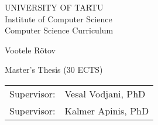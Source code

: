 \documentclass{style/master-thesis}
\begin{document}
\thispagestyle{empty}
\begin{center}

\large
UNIVERSITY OF TARTU\\[2mm]
Institute of Computer Science\\
Computer Science Curriculum\\[2mm]

\vspace{25mm}

\Large Vootele Rõtov

\vspace{4mm}

\huge \articleName

\vspace{20mm}

\Large Master's Thesis (30 ECTS)

\end{center}

\vspace{2mm}

\begin{flushright}
 {
 \setlength{\extrarowheight}{5pt}
 \begin{tabular}{r l} 
  \sffamily Supervisor: & \sffamily Vesal Vodjani, PhD \\
  \sffamily Supervisor: & \sffamily Kalmer Apinis, PhD
 \end{tabular}
 }
\end{flushright}

\vspace{10mm}

\vspace{2mm}



\vspace{2mm}


\vspace{8mm}
\end{document}

